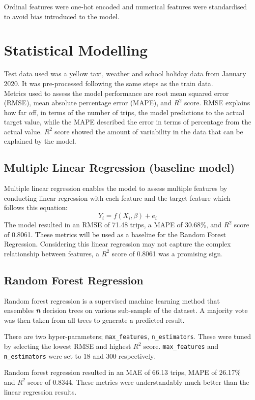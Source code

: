 \documentclass[11pt]{article}
\begin{document}
Ordinal features were one-hot encoded and numerical features were standardised to avoid bias introduced to the model.


\section{Statistical Modelling}
Test data used was a yellow taxi, weather and school holiday data from January 2020. It was pre-processed following the same steps as the train data.
\\
Metrics used to assess the model performance are root mean squared error (RMSE), mean absolute percentage error (MAPE), and $R^2$ score. RMSE explains how far off, in terms of the number of trips, the model predictions to the actual target value, while the MAPE described the error in terms of percentage from the actual value. $R^2$ score showed the amount of variability in the data that can be explained by the model.


\subsection{Multiple Linear Regression (baseline model)}
Multiple linear regression enables the model to assess multiple features by conducting linear regression with each feature and the target feature which follows this equation:
\[Y_i = f(X_i, \beta) + e_i\]
The model resulted in an RMSE of 71.48 trips, a MAPE of 30.68\%, and $R^2$ score of 0.8061. These metrics will be used as a baseline for the Random Forest Regression. Considering this linear regression may not capture the complex relationship between features, a $R^2$ score of 0.8061 was a promising sign.

\subsection{Random Forest Regression}
Random forest regression is a supervised machine learning method that ensembles \textbf{\textit{n}} decision trees on various sub-sample of the dataset. A majority vote was then taken from all trees to generate a predicted result.

There are two hyper-parameters; \texttt{max\_features}, \texttt{n\_estimators}. These were tuned by selecting the lowest RMSE and highest $R^2$ score. \texttt{max\_features} and \texttt{n\_estimators} were set to 18 and 300 respectively.

Random forest regression resulted in an MAE of 66.13 trips, MAPE of 26.17\% and $R^2$ score of 0.8344. These metrics were understandably much better than the linear regression results.
\end{document}
